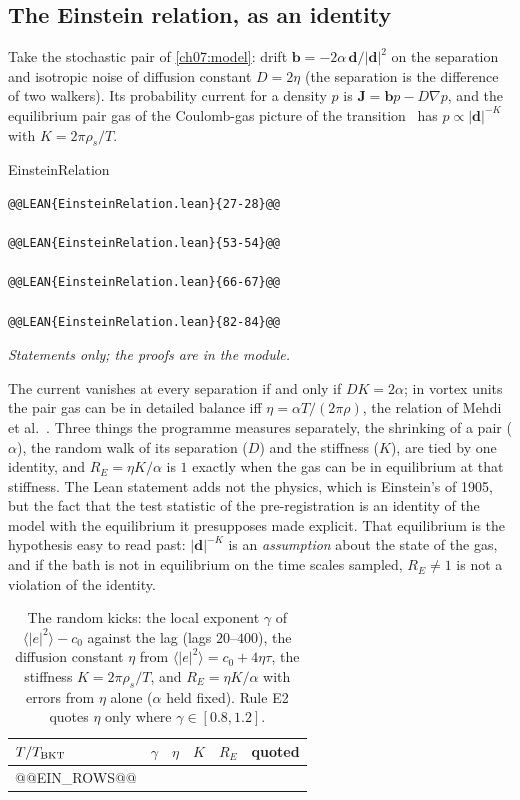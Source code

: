 \subsection*{The Einstein relation, as an identity}

Take the stochastic pair of \cref{ch07:model}: drift $\mathbf b=-2\alpha\,\mathbf d/|\mathbf d|^2$ on the separation and isotropic noise of diffusion constant $D=2\eta$ (the separation is the difference of two walkers). Its probability current for a density $p$ is $\mathbf J=\mathbf bp-D\nabla p$, and the equilibrium pair gas of the Coulomb-gas picture of the
transition~\cite{KosterlitzThouless1973} has $p\propto|\mathbf d|^{-K}$ with $K=2\pi\rho_s/T$.

\begin{leanbox}{EinsteinRelation}
\begin{lstlisting}[style=lean,basicstyle=\ttfamily\footnotesize]
@@LEAN{EinsteinRelation.lean}{27-28}@@

@@LEAN{EinsteinRelation.lean}{53-54}@@

@@LEAN{EinsteinRelation.lean}{66-67}@@

@@LEAN{EinsteinRelation.lean}{82-84}@@
\end{lstlisting}
\nopagebreak[4]\smallskip\noindent\textit{Statements only; the proofs are in the module.}
\end{leanbox}

The current vanishes at every separation if and only if $DK=2\alpha$; in vortex units the pair gas can be in detailed balance iff $\eta=\alpha T/(2\pi\rho)$, the relation of Mehdi et al.~\cite{Mehdi2023}. Three things the programme measures separately, the shrinking of a pair ($\alpha$), the random walk of its separation ($D$) and the stiffness ($K$), are tied by one identity, and
$R_E=\eta K/\alpha$ is $1$ exactly when the gas can be in equilibrium at that stiffness. The Lean statement adds not the physics, which is Einstein's of 1905, but the fact that the test statistic of the pre-registration is an identity of the model with the equilibrium it presupposes made explicit. That equilibrium is the hypothesis easy to read past: $|\mathbf d|^{-K}$ is an \emph{assumption} about the
state of the gas, and if the bath is not in equilibrium on the time scales sampled, $R_E\neq1$ is not a violation of the identity.

\begin{table}[!tb]\centering\small
\begin{tabular}{lccccc}
\toprule
$T/T_{\rm BKT}$ & $\gamma$ & $\eta$ & $K$ & $R_E$ & quoted\\
\midrule
@@EIN_ROWS@@
\bottomrule
\end{tabular}
\caption{The random kicks: the local exponent $\gamma$ of $\langle|e|^2\rangle-c_0$ against the lag (lags $20$--$400$), the diffusion constant $\eta$ from $\langle|e|^2\rangle=c_0+4\eta\tau$, the stiffness $K=2\pi\rho_s/T$, and $R_E=\eta K/\alpha$ with errors from $\eta$ alone ($\alpha$ held fixed). Rule E2 quotes $\eta$ only where $\gamma\in[0.8,1.2]$.}
\label{ch07:tab-kicks}
\end{table}

